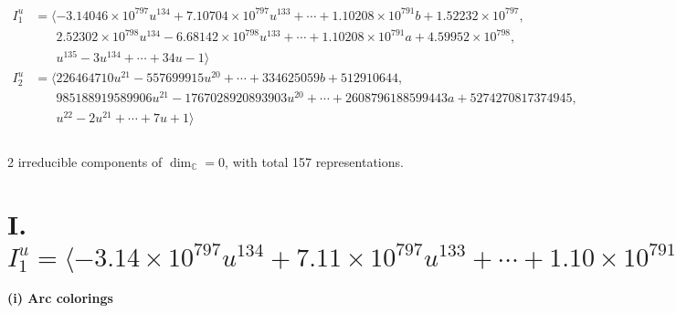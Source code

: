\documentclass[1p]{elsarticle_modified}
\theoremstyle{definition}
\begin{document}
\begin{align*}
I^u_{1}&=\langle 
-3.14046\times10^{797} u^{134}+7.10704\times10^{797} u^{133}+\cdots+1.10208\times10^{791} b+1.52232\times10^{797},\\
\phantom{I^u_{1}}&\phantom{= \langle  }2.52302\times10^{798} u^{134}-6.68142\times10^{798} u^{133}+\cdots+1.10208\times10^{791} a+4.59952\times10^{798},\\
\phantom{I^u_{1}}&\phantom{= \langle  }u^{135}-3 u^{134}+\cdots+34 u-1\rangle \\
I^u_{2}&=\langle 
226464710 u^{21}-557699915 u^{20}+\cdots+334625059 b+512910644,\\
\phantom{I^u_{2}}&\phantom{= \langle  }985188919589906 u^{21}-1767028920893903 u^{20}+\cdots+2608796188599443 a+5274270817374945,\\
\phantom{I^u_{2}}&\phantom{= \langle  }u^{22}-2 u^{21}+\cdots+7 u+1\rangle \\
\\
\end{align*}
\raggedright * 2 irreducible components of $\dim_{\mathbb{C}}=0$, with total 157 representations.\\
\newpage
\renewcommand{\arraystretch}{1}
\centering \section*{I. $I^u_{1}= \langle -3.14\times10^{797} u^{134}+7.11\times10^{797} u^{133}+\cdots+1.10\times10^{791} b+1.52\times10^{797},\;2.52\times10^{798} u^{134}-6.68\times10^{798} u^{133}+\cdots+1.10\times10^{791} a+4.60\times10^{798},\;u^{135}-3 u^{134}+\cdots+34 u-1 \rangle$}
\flushleft \textbf{(i) Arc colorings}\\
\end{document}
